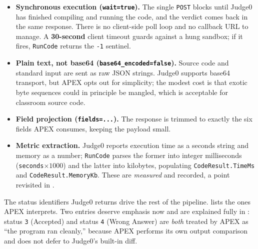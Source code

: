 \begin{itemize}[leftmargin=1.4em]
  \item \textbf{Synchronous execution (\texttt{wait=true}).} The single \texttt{POST} blocks
  until Judge0 has finished compiling and running the code, and the verdict comes back in the
  same response. There is no client-side poll loop and no callback URL to manage. A
  \textbf{30-second} client timeout guards against a hung sandbox; if it fires, \texttt{RunCode}
  returns the \texttt{-1} sentinel.
  \item \textbf{Plain text, not base64 (\texttt{base64\_encoded=false}).} Source code and
  standard input are sent as raw JSON strings. Judge0 supports base64 transport, but APEX opts
  out for simplicity; the modest cost is that exotic byte sequences could in principle be
  mangled, which is acceptable for classroom source code.
  \item \textbf{Field projection (\texttt{fields=...}).} The response is trimmed to exactly the
  six fields APEX consumes, keeping the payload small.
  \item \textbf{Metric extraction.} Judge0 reports execution time as a seconds string and
  memory as a number; \texttt{RunCode} parses the former into integer milliseconds
  (\texttt{seconds}$\times 1000$) and the latter into kilobytes, populating
  \texttt{CodeResult.TimeMs} and \texttt{CodeResult.MemoryKb}. These are \emph{measured} and
  recorded, a point revisited in .
\end{itemize}

The status identifiers Judge0 returns drive the rest of the pipeline. 
lists the ones APEX interprets. Two entries deserve emphasis now and are explained fully in
: status \texttt{3} (Accepted) and status \texttt{4} (Wrong Answer)
are \emph{both} treated by APEX as ``the program ran cleanly,'' because APEX performs its own
output comparison and does not defer to Judge0's built-in diff.

